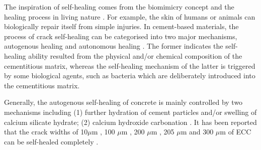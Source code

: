 \documentclass[11pt]{article}
\begin{document}

    The inspiration of self-healing comes from the biomimicry concept and the healing process in living nature \cite{ramadan2017modeling}. For example, the skin of humans or animals can biologically repair itself from simple injuries. In cement-based materials, the process of crack self-healing can be categorised into two major mechanisms, autogenous healing and autonomous healing \cite{tang2015robust}. The former indicates the self-healing ability resulted from the physical and/or chemical composition of the cementitious matrix, whereas the self-healing mechanism of the latter is triggered by some biological agents, such as bacteria which are deliberately introduced into the cementitious matrix.
	

Generally, the autogenous self-healing of concrete is mainly controlled by two mechanisms including (1) further hydration of cement particles and/or swelling of calcium silicate hydrate; (2) calcium hydroxide carbonation \cite{edvardsen1999water,tang2016selfhealing}. It has been reported that the crack widths of 10$\mu$m \cite{jacobsen1995sem}, 100 $\mu$m \cite{reinhardt2003permeability}, 200 $\mu$m \cite{csahmaran2008influence}, 205 $\mu$m \cite{edvardsen1999water} and 300 $\mu$m \cite{clear1985effects} of ECC can be self-healed completely \cite{sahmaran2013self}. 
	
\end{document}
